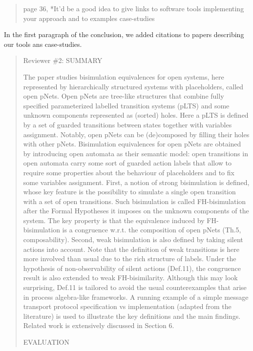 \documentclass[10pt]{article}
\newenvironment{review}{\bgroup\itshape\begin{quote}}{\end{quote}\egroup}
\begin{document}
\begin{review}
{page 36, *It'd be a good idea to give links to software tools implementing your approach and to examples case-studies}
\end{review}
In the first paragraph of the conclusion, we added citations to papers describing our tools ans case-studies.

\begin{review}
Reviewer \#2: SUMMARY

The paper studies bisimulation equivalences for open systems, here represented by hierarchically structured systems with placeholders, called open pNets.
Open pNets are tree-like structures that combine fully specified parameterized labelled transition systems (pLTS) and some unknown
components represented as (sorted) holes. Here a pLTS is defined by a set of guarded transitions between states together
with variables assignment. Notably, open pNets can be (de)composed by filling their holes with other pNets.
Bisimulation equivalences for open pNets are obtained by introducing open automata as their semantic model:
open transitions in open automata carry some sort of guarded action labels that allow to require some properties about the
behaviour of placeholders and to fix some variables assignment.
First, a notion of strong bisimulation is defined, whose key feature is the possibility to simulate a single open transition
with a set of open transitions. Such bisimulation is called FH-bisimulation after the Formal Hypotheses it imposes
on the unknown components of the system. The key property is that the equivalence induced by FH-bisimulation
is a congruence w.r.t. the composition of open pNets (Th.5, composability).
Second, weak bisimulation is also defined by taking silent actions into account.
Note that the definition of weak transitions is here more involved than usual due to the rich structure of labels.
Under the hypothesis of non-observability of silent actions (Def.11), the congruence result is also extended
to weak FH-bisimilarity. Although this may look surprising, Def.11 is tailored to avoid the usual counterexamples
that arise in process algebra-like frameworks.
A running example of a simple message transport protocol specification vs implementation (adapted from the literature) is used
to illustrate the key definitions and the main findings.
Related work is extensively discussed in Section 6.

EVALUATION


\end{review}
\end{document}
